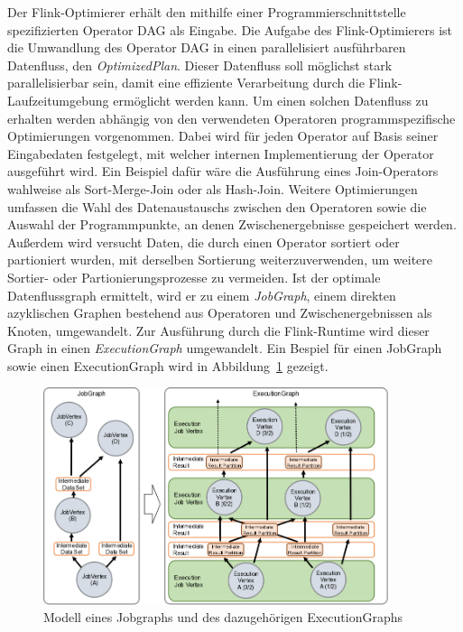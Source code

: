 Der Flink-Optimierer erhält den mithilfe einer Programmierschnittstelle spezifizierten Operator DAG als Eingabe. Die Aufgabe des Flink-Optimierers ist die Umwandlung des Operator DAG in einen parallelisiert ausführbaren Datenfluss, den \textit{OptimizedPlan}. Dieser Datenfluss soll möglichst stark parallelisierbar sein, damit eine effiziente Verarbeitung durch die Flink-Laufzeitumgebung ermöglicht werden kann. Um einen solchen Datenfluss zu erhalten werden abhängig von den verwendeten Operatoren programmspezifische Optimierungen vorgenommen. Dabei wird für jeden Operator auf Basis seiner Eingabedaten festgelegt, mit welcher internen Implementierung der Operator ausgeführt wird. Ein Beispiel dafür wäre die Ausführung eines Join-Operators wahlweise als Sort-Merge-Join oder als Hash-Join. Weitere Optimierungen umfassen die Wahl des Datenaustauschs zwischen den Operatoren sowie die Auswahl der Programmpunkte, an denen Zwischenergebnisse gespeichert werden. Außerdem wird versucht Daten, die durch einen Operator sortiert oder partioniert wurden, mit derselben Sortierung weiterzuverwenden, um weitere Sortier- oder Partionierungsprozesse zu vermeiden. Ist der optimale Datenflussgraph ermittelt, wird er zu einem \textit{JobGraph}, einem direkten azyklischen Graphen bestehend aus Operatoren und Zwischenergebnissen als Knoten, umgewandelt. Zur Ausführung durch die Flink-Runtime wird dieser Graph in einen \textit{ExecutionGraph} umgewandelt. Ein Bespiel für einen JobGraph sowie einen ExecutionGraph wird in Abbildung~\ref{graphicJobExecution} gezeigt. 

\begin{figure}[h]
	\centering
	\includegraphics[width=0.9\textwidth]{picture/flink_job_and_execution_graph.png}
	\caption{Modell eines Jobgraphs und des dazugehörigen ExecutionGraphs \cite{FlinkJobWebsite}}
	\label{graphicJobExecution}
\end{figure}

